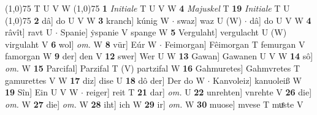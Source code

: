 \documentclass[8pt,a4paper,notitlepage]{article}
\begin{document}
\begin{table}[ht]
\begin{minipage}[t]{0.5\linewidth}
\scriptsize
\line(1,0){75} \newline
T U V W \newline
\line(1,0){75} \newline
\textbf{1} \textit{Initiale} T U V W  \textbf{4} \textit{Majuskel} T  \textbf{19} \textit{Initiale} T U  \newline
\line(1,0){75} \newline
\textbf{2} dâ] do U V W \textbf{3} kranch] kúnig W  $\cdot$ swaz] waz U (W)  $\cdot$ dâ] do U V W \textbf{4} râvît] ravt U  $\cdot$ Spanie] ẏspanie V spange W \textbf{5} Vergulaht] vergulacht U (W) virgulaht V \textbf{6} wol] \textit{om.} W \textbf{8} vür] Eúr W  $\cdot$ Feimorgan] Fêimorgan T femurgan V famorgan W \textbf{9} der] den V \textbf{12} swer] Wer U W \textbf{13} Gawan] Gawanen U V W \textbf{14} sô] \textit{om.} W \textbf{15} Parcifal] Parzifal T (V) partzifal W \textbf{16} Gahmuretes] Gahmvretes T gamurettes V W \textbf{17} diz] dise U \textbf{18} dô der] Der do W  $\cdot$ Kanvoleiz] kanuoleiß W \textbf{19} Sîn] Ein U V W  $\cdot$ reiger] reit T \textbf{21} dar] \textit{om.} U \textbf{22} unrehten] vnrehte V \textbf{26} die] \textit{om.} W \textbf{27} die] \textit{om.} W \textbf{28} iht] ich W \textbf{29} ir] \textit{om.} W \textbf{30} muose] mvese T muͤste V \newline
\end{minipage}
\end{table}
\end{document}
